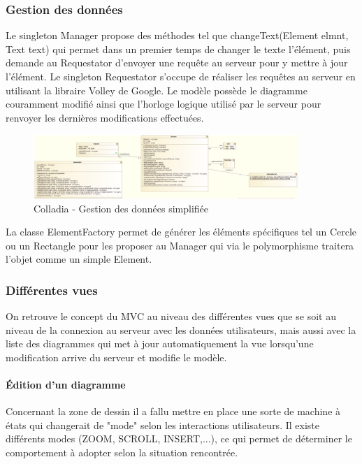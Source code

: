 \subsubsection{Gestion des données}
Le singleton Manager propose des méthodes tel que changeText(Element elmnt, Text text) qui permet dans un premier temps de changer le texte l'élément, puis demande au Requestator d'envoyer une requête au serveur pour y mettre à jour l'élément. Le singleton Requestator s'occupe de réaliser les requêtes au serveur en utilisant la libraire Volley de Google.
Le modèle possède le diagramme couramment modifié ainsi que l'horloge logique utilisé par le serveur pour renvoyer les dernières modifications effectuées.
	\begin{figure}[!h]
		\centering
		\includegraphics[width=10cm]{img/UmlArchiGeneral}
		\caption{Colladia - Gestion des données simplifiée}
	\end{figure}
La classe ElementFactory permet de générer les éléments spécifiques tel un Cercle ou un Rectangle pour les proposer au Manager qui via le polymorphisme traitera l'objet comme un simple Element.

\subsubsection{Différentes vues}
On retrouve le concept du MVC au niveau des différentes vues que se soit au niveau de la connexion au serveur avec les données utilisateurs, mais aussi avec la liste des diagrammes qui met à jour automatiquement la vue lorsqu'une modification arrive du serveur et modifie le modèle.
\paragraph{Édition d'un diagramme}
Concernant la zone de dessin il a fallu mettre en place une sorte de machine à états qui changerait de "mode" selon les interactions utilisateurs. Il existe différents modes (ZOOM, SCROLL, INSERT,...), ce qui permet de déterminer le comportement à adopter selon la situation rencontrée.

